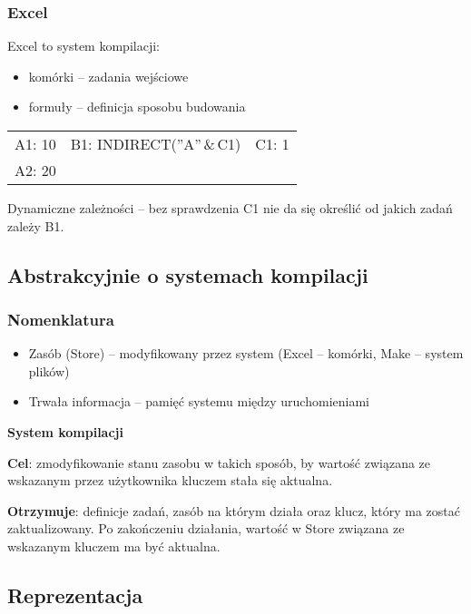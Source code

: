 \begin{frame}
  \frametitle{Excel}

  Excel to system kompilacji:
  \begin{itemize}
  \item komórki -- zadania wejściowe
  \item formuły -- definicja sposobu budowania
  \end{itemize}

  \vspace{1em}
  \begin{tabular}{ l c r }
  A1: 10 & B1: INDIRECT(''A''\,\&\,C1) & C1: 1 \\
  A2: 20 & &
  \end{tabular}

  \vspace{1em}
  Dynamiczne zależności -- bez sprawdzenia C1 nie da się określić od jakich zadań zależy B1.
\end{frame}

\subsection{Abstrakcyjnie o systemach kompilacji}

\begin{frame}
  \frametitle{Nomenklatura}

  \begin{itemize}
  \item Zasób (Store) -- modyfikowany przez system (Excel -- komórki, Make -- system plików)
  \item Trwała informacja -- pamięć systemu między uruchomieniami
  \end{itemize}

  \vspace{1.25em}
  \textbf{System kompilacji}
  \vspace{.75em}
  
  \textbf{Cel}: zmodyfikowanie stanu zasobu w takich sposób, by wartość związana ze wskazanym przez użytkownika kluczem stała się aktualna.
  
  \textbf{Otrzymuje}: definicje zadań, zasób na którym działa oraz klucz, który ma zostać zaktualizowany. Po zakończeniu działania, wartość w Store związana ze wskazanym kluczem ma być aktualna.
\end{frame}
  
\subsection{Reprezentacja}

